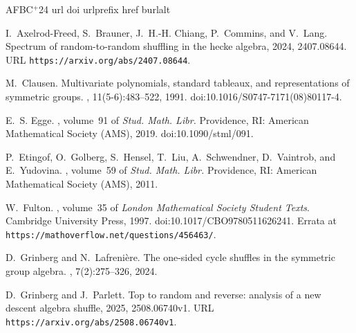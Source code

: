 \documentclass[numbers=enddot,12pt,final,onecolumn,notitlepage]{scrartcl}%
\theoremstyle{definition}
\begin{document}
\newcommand{\etalchar}[1]{$^{#1}$}
\begin{thebibliography}{AFBC{\etalchar{+}}24}
\expandafter\ifx\csname url\endcsname\relax
  \def\url#1{\texttt{#1}}\fi
\expandafter\ifx\csname doi\endcsname\relax
  \def\doi#1{\burlalt{doi:#1}{https://doi.org/#1}}\fi
\expandafter\ifx\csname urlprefix\endcsname\relax\def\urlprefix{URL }\fi
\expandafter\ifx\csname href\endcsname\relax
  \def\href#1#2{#2}\fi
\expandafter\ifx\csname burlalt\endcsname\relax
  \def\burlalt#1#2{\href{#2}{#1}}\fi

\bibitem[AFBC{\etalchar{+}}24]{2407.08644}
I.~Axelrod-Freed, S.~Brauner, J.~H.-H. Chiang, P.~Commins, and V.~Lang.
\newblock Spectrum of random-to-random shuffling in the hecke algebra, 2024,
  \burlalt{2407.08644}{http://arxiv.org/abs/2407.08644}.
\newblock \urlprefix\url{https://arxiv.org/abs/2407.08644}.

M.~Clausen.
\newblock Multivariate polynomials, standard tableaux, and representations of
  symmetric groups.
, 11(5-6):483--522, 1991.
\newblock \doi{10.1016/S0747-7171(08)80117-4}.

E.~S. Egge.
,
  volume~91 of {\em Stud. Math. Libr.}
\newblock Providence, RI: American Mathematical Society (AMS), 2019.
\newblock \doi{10.1090/stml/091}.

\bibitem[EGH{\etalchar{+}}11]{Etingof-et-al}
P.~Etingof, O.~Golberg, S.~Hensel, T.~Liu, A.~Schwendner, D.~Vaintrob, and
  E.~Yudovina.
, volume~59 of {\em Stud. Math. Libr.}
\newblock Providence, RI: American Mathematical Society (AMS), 2011.

W.~Fulton.
, volume~35 of {\em London Mathematical Society
  Student Texts}.
\newblock Cambridge University Press, 1997.
\newblock \doi{10.1017/CBO9780511626241}.
\newblock Errata at \url{https://mathoverflow.net/questions/456463/}.

D.~Grinberg and N.~Lafreni\`ere.
\newblock The one-sided cycle shuffles in the symmetric group algebra.
, 7(2):275--326, 2024.

D.~Grinberg and J.~Parlett.
\newblock Top to random and reverse: analysis of a new descent algebra shuffle,
  2025, \burlalt{2508.06740v1}{http://arxiv.org/abs/2508.06740v1}.
\newblock \urlprefix\url{https://arxiv.org/abs/2508.06740v1}.


\end{thebibliography}
\end{document}
